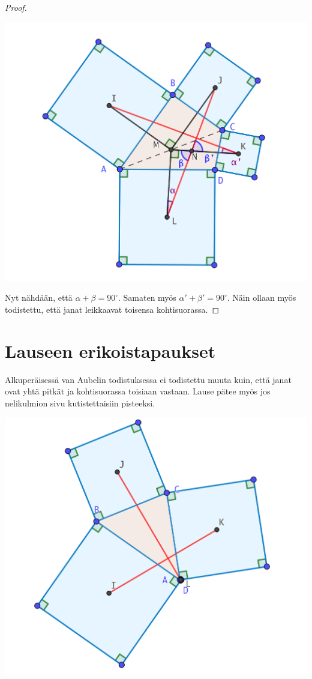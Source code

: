 \documentclass{scrartcl}
\begin{document}
\begin{proof}
\begin{center}
    \includegraphics[scale=0.25]{todistuksenjatkoa.png}
\end{center}

Nyt nähdään, että $\alpha + \beta = 90^\circ$. Samaten myös $\alpha' + \beta' = 90^\circ$. Näin ollaan myös todistettu, että janat leikkaavat toisensa kohtisuorassa.
\end{proof}

\pagebreak
\section{Lauseen erikoistapaukset}
Alkuperäisessä van Aubelin todistuksessa ei todistettu muuta kuin, että janat ovat yhtä pitkät ja kohtisuorassa toisiaan vastaan. Lause pätee myös jos nelikulmion sivu kutistettaisiin pisteeksi.
\begin{center}
    \includegraphics[scale=0.15]{sivupisteeksi.png}
\end{center}
\end{document}
